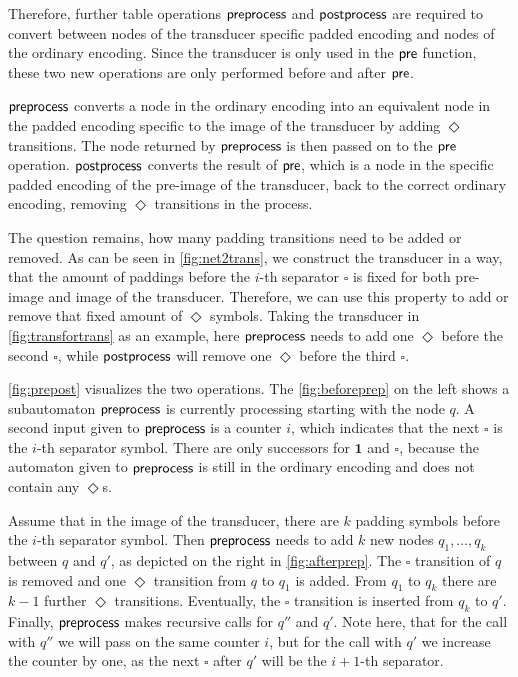Therefore, further table operations $\operatorname{\textsf{preprocess}}$ and $\operatorname{\textsf{postprocess}}$ are required to convert between nodes of the transducer specific padded encoding and nodes of the ordinary encoding. Since the transducer is only used in the $\operatorname{\textsf{pre}}$ function, these two new operations are only performed before and after $\operatorname{\textsf{pre}}$. 

$\operatorname{\textsf{preprocess}}$ converts a node in the ordinary encoding into an equivalent node in the padded encoding specific to the image of the transducer by adding $\Diamond$ transitions. The node returned by $\operatorname{\textsf{preprocess}}$ is then passed on to the $\operatorname{\textsf{pre}}$ operation. $\operatorname{\textsf{postprocess}}$ converts the result of $\operatorname{\textsf{pre}}$, which is a node in the specific padded encoding of the pre-image of the transducer, back to the correct ordinary encoding, removing $\Diamond$ transitions in the process.

The question remains, how many padding transitions need to be added or removed.
As can be seen in \autoref{fig:net2trans}, we construct the transducer in a way, that the amount of paddings before the $i$-th separator $\square$ is fixed for both pre-image and image of the transducer. Therefore, we can use this property to add or remove that fixed amount of $\Diamond$ symbols. Taking the transducer in \autoref{fig:transfortrans} as an example, here $\operatorname{\textsf{preprocess}}$ needs to add one $\Diamond$ before the second $\square$, while $\operatorname{\textsf{postprocess}}$ will remove one $\Diamond$ before the third $\square$.



\autoref{fig:prepost} visualizes the two operations. The \autoref{fig:beforeprep} on the left shows a subautomaton $\operatorname{\textsf{preprocess}}$ is currently processing starting with the node $q$. A second input given to $\operatorname{\textsf{preprocess}}$ is a counter $i$, which indicates that the next $\square$ is the $i$-th separator symbol. There are only successors for $\bm{1}$ and $\square$, because the automaton given to $\operatorname{\textsf{preprocess}}$ is still in the ordinary encoding and does not contain any $\Diamond$s. 

Assume that in the image of the transducer, there are $k$ padding symbols before the $i$-th separator symbol. Then $\operatorname{\textsf{preprocess}}$ needs to add $k$ new nodes $q_{1},\dots,q_{k}$ between $q$ and $q'$, as depicted on the right in \autoref{fig:afterprep}. The $\square$ transition of $q$ is removed and one $\Diamond$ transition from $q$ to $q_{1}$ is added. From $q_{1}$ to $q_{k}$ there are $k-1$ further $\Diamond$ transitions. Eventually, the $\square$ transition is inserted from $q_{k}$ to $q'$. Finally, $\operatorname{\textsf{preprocess}}$ makes recursive calls for $q''$ and $q'$. Note here, that for the call with $q''$ we will pass on the same counter $i$, but for the call with $q'$ we increase the counter by one, as the next $\square$ after $q'$ will be the $i+1$-th separator.

